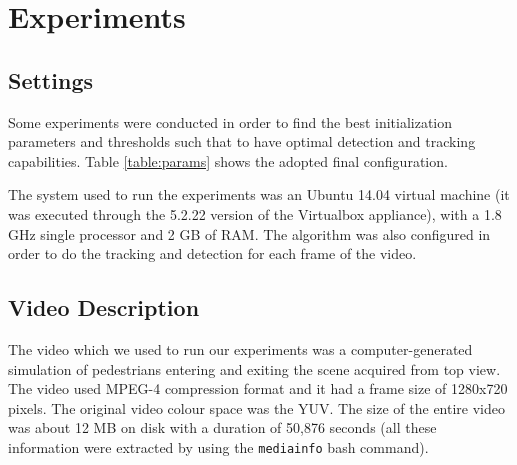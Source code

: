 \documentclass[runningheads]{llncs}
\begin{document}
\section{Experiments}

\subsection{Settings}
Some experiments were conducted in order to find the best initialization parameters and thresholds such that to have optimal detection and tracking capabilities. Table \ref{table:params} shows the adopted final configuration. 

The system used to run the experiments was an Ubuntu 14.04 virtual machine (it was executed through the 5.2.22 version of the Virtualbox appliance), with a 1.8 GHz single processor and 2 GB of RAM. The algorithm was also configured in order to do the tracking and detection for each frame of the video.

\begin{table}[h]
\centering
\caption{Final parameters for the algorithm}
\label{table:params}
\end{table}

\subsection{Video Description}

The video which we used to run our experiments was a computer-generated simulation of pedestrians entering and exiting the scene acquired from top view. The video used MPEG-4 compression format and it had a frame size of 1280x720 pixels. The original video colour space was the YUV. The size of the entire video was about 12 MB on disk with a duration of 50,876 seconds (all these information were extracted by using the \texttt{mediainfo} bash command).
\end{document}

